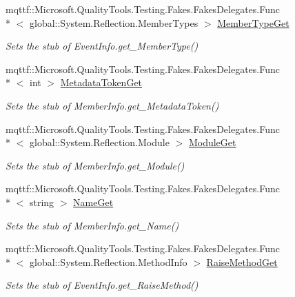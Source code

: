 \begin{DoxyCompactItemize}
mqttf\-::\-Microsoft.\-Quality\-Tools.\-Testing.\-Fakes.\-Fakes\-Delegates.\-Func\\*
$<$ global\-::\-System.\-Reflection.\-Member\-Types $>$ \hyperlink{class_system_1_1_reflection_1_1_fakes_1_1_stub_event_info_a94e0a32c474604fca52d7eed50c28c7c}{Member\-Type\-Get}
\begin{DoxyCompactList}\small\item\em Sets the stub of Event\-Info.\-get\-\_\-\-Member\-Type()\end{DoxyCompactList}\item 
mqttf\-::\-Microsoft.\-Quality\-Tools.\-Testing.\-Fakes.\-Fakes\-Delegates.\-Func\\*
$<$ int $>$ \hyperlink{class_system_1_1_reflection_1_1_fakes_1_1_stub_event_info_aa831e3ce342f746badd04320e8eedd17}{Metadata\-Token\-Get}
\begin{DoxyCompactList}\small\item\em Sets the stub of Member\-Info.\-get\-\_\-\-Metadata\-Token()\end{DoxyCompactList}\item 
mqttf\-::\-Microsoft.\-Quality\-Tools.\-Testing.\-Fakes.\-Fakes\-Delegates.\-Func\\*
$<$ global\-::\-System.\-Reflection.\-Module $>$ \hyperlink{class_system_1_1_reflection_1_1_fakes_1_1_stub_event_info_a2472a6a60a4b5906ddc430d99df55227}{Module\-Get}
\begin{DoxyCompactList}\small\item\em Sets the stub of Member\-Info.\-get\-\_\-\-Module()\end{DoxyCompactList}\item 
mqttf\-::\-Microsoft.\-Quality\-Tools.\-Testing.\-Fakes.\-Fakes\-Delegates.\-Func\\*
$<$ string $>$ \hyperlink{class_system_1_1_reflection_1_1_fakes_1_1_stub_event_info_a381ceb7f1a9cfa2da59c191007045edf}{Name\-Get}
\begin{DoxyCompactList}\small\item\em Sets the stub of Member\-Info.\-get\-\_\-\-Name()\end{DoxyCompactList}\item 
mqttf\-::\-Microsoft.\-Quality\-Tools.\-Testing.\-Fakes.\-Fakes\-Delegates.\-Func\\*
$<$ global\-::\-System.\-Reflection.\-Method\-Info $>$ \hyperlink{class_system_1_1_reflection_1_1_fakes_1_1_stub_event_info_aeb5c39bffaf96344dee43bf7e87e263c}{Raise\-Method\-Get}
\begin{DoxyCompactList}\small\item\em Sets the stub of Event\-Info.\-get\-\_\-\-Raise\-Method()\end{DoxyCompactList}\item 

\end{DoxyCompactItemize}
